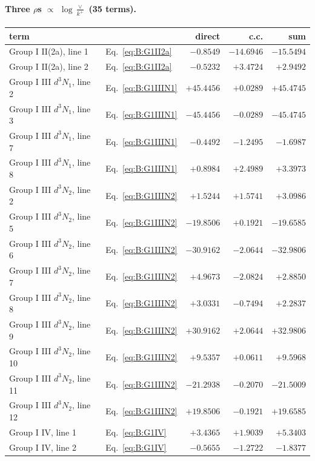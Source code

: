 \documentclass[10pt]{article}
\numberwithin{equation}{section}
\begin{document}
\paragraph{Three $\rho$\textquotesingle s $\propto$ $\log\frac{\vee}{k^+}$ (35 terms).}
\begin{longtable}{@{}llrrr@{}}\toprule
term & & direct & c.c. & sum\\\midrule
Group I II(2a), line 1 & Eq.~\eqref{eq:B:G1II2a} & $-0.8549$ & $-14.6946$ & $-15.5494$\\
Group I II(2a), line 2 & Eq.~\eqref{eq:B:G1II2a} & $-0.5232$ & $+3.4724$ & $+2.9492$\\
Group I III $d^3N_1$, line 2 & Eq.~\eqref{eq:B:G1IIIN1} & $+45.4456$ & $+0.0289$ & $+45.4745$\\
Group I III $d^3N_1$, line 3 & Eq.~\eqref{eq:B:G1IIIN1} & $-45.4456$ & $-0.0289$ & $-45.4745$\\
Group I III $d^3N_1$, line 7 & Eq.~\eqref{eq:B:G1IIIN1} & $-0.4492$ & $-1.2495$ & $-1.6987$\\
Group I III $d^3N_1$, line 8 & Eq.~\eqref{eq:B:G1IIIN1} & $+0.8984$ & $+2.4989$ & $+3.3973$\\
Group I III $d^3N_2$, line 2 & Eq.~\eqref{eq:B:G1IIIN2} & $+1.5244$ & $+1.5741$ & $+3.0986$\\
Group I III $d^3N_2$, line 5 & Eq.~\eqref{eq:B:G1IIIN2} & $-19.8506$ & $+0.1921$ & $-19.6585$\\
Group I III $d^3N_2$, line 6 & Eq.~\eqref{eq:B:G1IIIN2} & $-30.9162$ & $-2.0644$ & $-32.9806$\\
Group I III $d^3N_2$, line 7 & Eq.~\eqref{eq:B:G1IIIN2} & $+4.9673$ & $-2.0824$ & $+2.8850$\\
Group I III $d^3N_2$, line 8 & Eq.~\eqref{eq:B:G1IIIN2} & $+3.0331$ & $-0.7494$ & $+2.2837$\\
Group I III $d^3N_2$, line 9 & Eq.~\eqref{eq:B:G1IIIN2} & $+30.9162$ & $+2.0644$ & $+32.9806$\\
Group I III $d^3N_2$, line 10 & Eq.~\eqref{eq:B:G1IIIN2} & $+9.5357$ & $+0.0611$ & $+9.5968$\\
Group I III $d^3N_2$, line 11 & Eq.~\eqref{eq:B:G1IIIN2} & $-21.2938$ & $-0.2070$ & $-21.5009$\\
Group I III $d^3N_2$, line 12 & Eq.~\eqref{eq:B:G1IIIN2} & $+19.8506$ & $-0.1921$ & $+19.6585$\\
Group I IV, line 1 & Eq.~\eqref{eq:B:G1IV} & $+3.4365$ & $+1.9039$ & $+5.3403$\\
Group I IV, line 2 & Eq.~\eqref{eq:B:G1IV} & $-0.5655$ & $-1.2722$ & $-1.8377$\\

\end{longtable}
\end{document}
